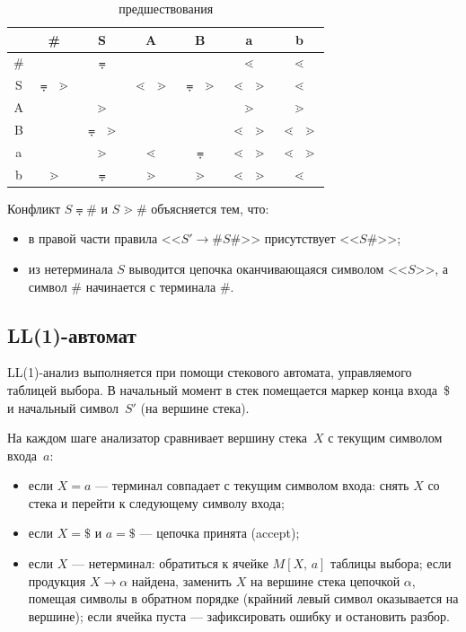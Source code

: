 \documentclass[a4paper,final]{article}
\begin{document}
\begin{table}[H]
    \centering
    \caption{ предшествования}
    \begin{tabular}{|c|c|c|c|c|c|c|}\hline
         & \# & S & A & B & a & b\\\hline
        \# &  & $\eqdot$ &  &  & $\lessdot$ & $\lessdot$ \\\hline
        S & $\eqdot$ $\gtrdot$ &  & $\lessdot$ $\gtrdot$ & $\eqdot$ $\gtrdot$ & $\lessdot$ $\gtrdot$ & $\lessdot$ \\\hline
        A &  & $\gtrdot$ &  &  & $\gtrdot$ & $\gtrdot$ \\\hline
        B &  & $\eqdot$ $\gtrdot$ &  &  & $\lessdot$ $\gtrdot$ & $\lessdot$ $\gtrdot$ \\\hline
        a &  & $\gtrdot$ &  $\lessdot$ & $\eqdot$ & $\lessdot$ $\gtrdot$ & $\lessdot$ $\gtrdot$ \\\hline
        b & $\gtrdot$ & $\eqdot$ & $\gtrdot$ & $\gtrdot$ & $\lessdot$ $\gtrdot$ & $\lessdot$ \\\hline
    \end{tabular}
\end{table}

Конфликт $S \eqdot \#$ и $S \gtrdot \#$ объясняется тем, что:
\begin{itemize}
    \item в правой части правила <<$S' \rightarrow \#S\#$>> присутствует <<$S\#$>>;
    \item из нетерминала $S$ выводится цепочка оканчивающаяся символом <<$S$>>, а символ \# начинается с терминала \#.
\end{itemize}

\subsection{LL(1)-автомат}

LL(1)-анализ выполняется при помощи стекового автомата, управляемого
таблицей выбора. В начальный момент в стек помещается маркер конца
входа~\$ и начальный символ~$S'$ (на вершине стека).

На каждом шаге анализатор сравнивает вершину стека~$X$ с текущим
символом входа~$a$:

\begin{itemize}
    \item если $X = a$ --- терминал совпадает с текущим символом входа:
    снять $X$ со стека и перейти к следующему символу входа;

    \item если $X = \$$ и $a = \$$ --- цепочка принята (accept);

    \item если $X$ --- нетерминал: обратиться к ячейке $M[X,\, a]$
    таблицы выбора; если продукция $X \to \alpha$ найдена, заменить
    $X$ на вершине стека цепочкой $\alpha$, помещая символы в обратном
    порядке (крайний левый символ оказывается на вершине); если ячейка
    пуста --- зафиксировать ошибку и остановить разбор.
\end{itemize}
\end{document}
